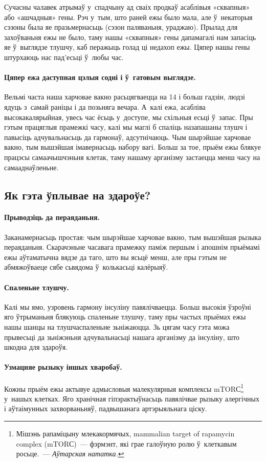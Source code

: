 Сучасны чалавек атрымаў у~спадчыну ад сваіх продкаў асаблівыя «сквапныя» або «ашчадныя» гены. Рэч у~тым, што раней ежы было мала, але ў~некаторыя сэзоны была яе празьмернасьць (сэзон паляваньня, ураджаю). Прылад для захоўваньня ежы не было, таму нашы «сквапныя» гены дапамагалі нам запасіць яе ў~выглядзе тлушчу, каб перажыць голад ці недахоп ежы. Цяпер нашы гены штурхаюць нас пад'есьці ў~любы час.

\paragraph{Цяпер ежа даступная цэлыя содні і ў~гатовым выглядзе.}

Вельмі часта наша харчовае вакно расьцягваецца на 14 і больш гадзін, людзі ядуць з~самай раніцы і да позьняга вечара. А~калі ежа, асабліва высокакалярыйная, увесь час ёсьць у~доступе, мы схільныя есьці ў~запас. Пры гэтым працяглыя прамежкі часу, калі мы маглі б спаліць назапашаны тлушч і павысіць адчувальнасьць да гармонаў, адсутнічаюць. Чым шырэйшае харчовае вакно, тым вышэйшая імавернасьць набору вагі. Больш за тое, прыём ежы блякуе працэсы самаачышчэньня клетак, таму нашаму арганізму застаецца менш часу на самааднаўленьне.

\subsection{Як гэта ўплывае на здароўе?}

\paragraph{Прыводзіць да пераяданьня.}
Заканамернасьць простая: чым шырэйшае харчовае вакно, тым вышэйшая рызыка пераяданьня. Скарачэньне часавага прамежку паміж першым і апошнім прыёмамі ежы аўтаматычна вядзе да таго, што вы ясьцё менш, але пры гэтым не абмяжоўваеце сябе сьвядома ў~колькасьці калёрыяў.

\paragraph{Спаленьне тлушчу.}
Калі мы ямо, узровень гармону інсуліну павялічваецца. Больш высокія ўзроўні яго ўтрыманьня блякуюць спаленьне тлушчу, таму пры частых прыёмах ежы нашы шанцы на тлушчаспаленьне зьніжаюцца. Зь цягам часу гэта можа прывесьці да зьніжэньня адчувальнасьці нашага арганізму да інсуліну, што шкодна для здароўя.

\paragraph{Узмацняе рызыку іншых хваробаў.}
Кожны прыём ежы актывуе адмысловыя малекулярныя комплексы mTORС\footnote{Мішэнь рапаміцыну млекакормячых, mammalian target of rapamycin
complex (mTORС)~--- фэрмэнт, які грае галоўную ролю ў~клеткавым 
росьце.~--- \emph{Аўтарская нататка.}} у~нашых клетках. Яго хранічная гіпэрактыўнасьць павялічвае рызыку алергічных і аўтаімунных захворваньняў, падвышанага артэрыяльнага ціску.

